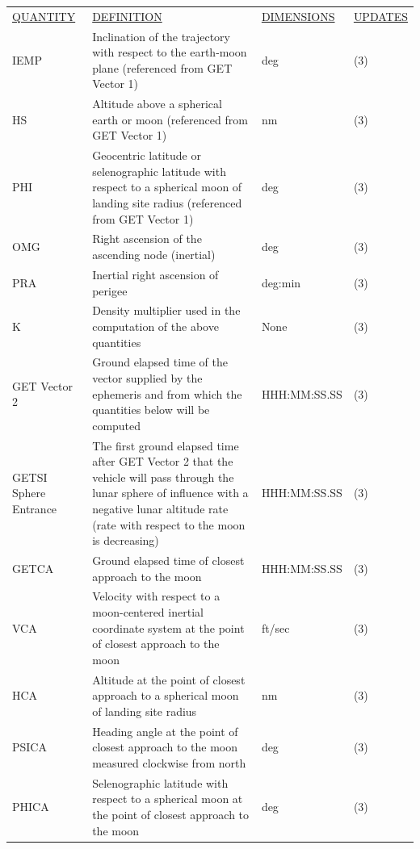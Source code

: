 \documentclass[11pt]{article} %
\begin{document}
\begin{center}
\begin{tabular}{ L{2.4cm} L{5.1cm} L{3cm} L{3.8cm} }
\underline{QUANTITY} & \underline{DEFINITION} & \underline{DIMENSIONS} & \underline{UPDATES} \\
IEMP & Inclination of the trajectory with respect to the earth-moon plane (referenced from GET Vector 1) & deg & (3)\\
HS & Altitude above a spherical earth or moon (referenced from GET Vector 1) & nm & (3)\\
PHI & Geocentric latitude or selenographic latitude with respect to a spherical moon of landing site radius (referenced from GET Vector 1) & deg & (3)\\
OMG & Right ascension of the ascending node (inertial) & deg & (3)\\
PRA & Inertial right ascension of perigee & deg:min & (3)\\
K & Density multiplier used in the computation of the above quantities & None & (3)\\
GET Vector 2 & Ground elapsed time of the vector supplied by the ephemeris and from which the quantities below will be computed & HHH:MM:SS.SS & (3)\\
GETSI Sphere Entrance & The first ground elapsed time after GET Vector 2 that the vehicle will pass through the lunar sphere of influence with a negative lunar altitude rate (rate with respect to the moon is decreasing) & HHH:MM:SS.SS & (3)\\
GETCA & Ground elapsed time of closest approach to the moon & HHH:MM:SS.SS & (3)\\
VCA &  Velocity with respect to a moon-centered inertial coordinate system at the point of closest approach to the moon & ft/sec & (3)\\
HCA & Altitude at the point of closest approach to a spherical moon of landing site radius & nm & (3)\\
PSICA & Heading angle at the point of closest approach to the moon measured clockwise from north & deg & (3)\\
PHICA & Selenographic latitude with respect to a spherical moon at the point of closest approach to the moon & deg & (3)\\
\end{tabular}
\end{center}
\end{document}
